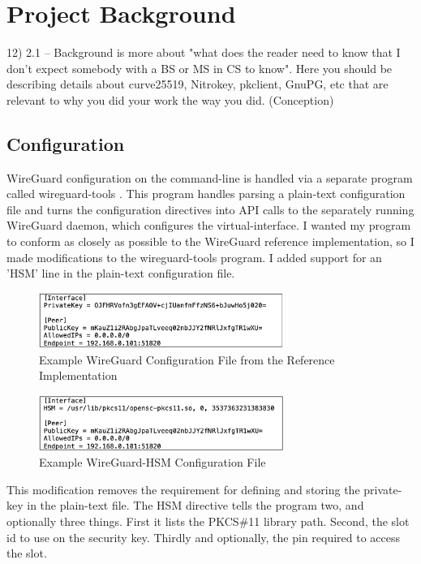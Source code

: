 \documentclass [11pt, proquest] {uwthesis}[2020/02/24]
\begin{document}
\chapter {Project Background}

12)  2.1 -- Background is more about "what does the reader need to know that I don't expect somebody with a BS or MS in CS to know". Here you should be describing details about curve25519, Nitrokey, pkclient, GnuPG, etc that are relevant to why you did your work the way you did. (Conception)

\section{Configuration}
WireGuard configuration on the command-line is handled via a separate program called wireguard-tools \cite{noauthor_wireguard-tools_2022}. This program handles parsing a plain-text configuration file and turns the configuration directives into API calls to the separately running WireGuard daemon, which configures the virtual-interface. I wanted my program to conform as closely as possible to the WireGuard reference implementation, so I made modifications to the wireguard-tools program. I added support for an 'HSM' line in the plain-text configuration file. 
\begin{figure}[ht]
\includegraphics[width=8cm]{paper/images/wg_conf_std.png}
\caption{Example WireGuard Configuration File from the Reference Implementation}
\label{fig:wg_config}
\end{figure}

\begin{figure}[ht]
\includegraphics[width=8cm]{paper/images/wg_conf_hsm.png}
\caption{Example WireGuard-HSM Configuration File}
\label{fig:hsm_config}
\end{figure}
This modification removes the requirement for defining and storing the private-key in the plain-text file. The HSM directive tells the program two, and optionally three things. First it lists the PKCS\#11 library path. Second, the slot id  to use on the security key. Thirdly and optionally, the pin required to access the slot.
\end{document}
